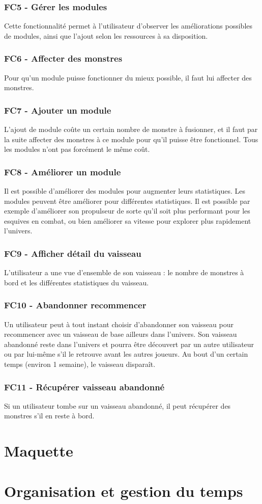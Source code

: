 \documentclass[a4paper,11pt]{report}
\begin{document}
        \subsection{FC5 - Gérer les modules}
            Cette fonctionnalité permet à l'utilisateur d'observer les améliorations possibles de modules, ainsi que l'ajout selon les ressources à sa disposition.

        \subsection{FC6 - Affecter des monstres}
            Pour qu'un module puisse fonctionner du mieux possible, il faut lui affecter des monstres.

        \subsection{FC7 - Ajouter un module}
            L'ajout de module coûte un certain nombre de monstre à fusionner, et il faut par la suite affecter des monstres à ce module pour qu'il puisse être fonctionnel. Tous les modules n'ont pas forcément le même coût.

        \subsection{FC8 - Améliorer un module}
            Il est possible d'améliorer des modules pour augmenter leurs statistiques. Les modules peuvent être améliorer pour différentes statistiques. Il est possible par exemple d'améliorer son propulseur de sorte qu'il soit plus performant pour les esquives en combat, ou bien améliorer sa vitesse pour explorer plus rapidement l'univers.

        \subsection{FC9 - Afficher détail du vaisseau}
            L'utilisateur a une vue d'ensemble de son vaisseau : le nombre de monstres à bord et les différentes statistiques du vaisseau.

        \subsection{FC10 - Abandonner recommencer}
            Un utilisateur peut à tout instant choisir d'abandonner son vaisseau pour recommencer avec un vaisseau de base ailleurs dans l'univers. Son vaisseau abandonné reste dans l'univers et pourra être découvert par un autre utilisateur ou par lui-même s'il le retrouve avant les autres joueurs. Au bout d'un certain temps (environ 1 semaine), le vaisseau disparaît.

        \subsection{FC11 - Récupérer vaisseau abandonné}
            Si un utilisateur tombe sur un vaisseau abandonné, il peut récupérer des monstres s'il en reste à bord.
    
\chapter{Maquette}


\chapter{Organisation et gestion du temps}
\end{document}
